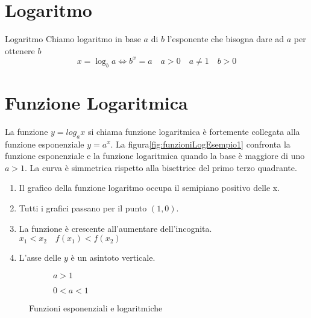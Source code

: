 \section{Logaritmo}
\label{sec:Lograritmo}
\begin{definizionet}{Logaritmo}{}
	Chiamo logaritmo in base $a$ di $b$ l'esponente che bisogna dare ad $a$ per ottenere $b$ \[x=\log_ba\Leftrightarrow b^{x}=a\quad a>0\quad a\neq  1\quad b>0 \]
\end{definizionet} 
\section{Funzione Logaritmica}
\label{FunzioneLogaritmica}
La funzione $y=log_ax$ si chiama funzione logaritmica è fortemente collegata alla funzione esponenziale $y=a^x$. La figura\nobs\vref{fig:funzioniLogEsempio1} confronta la funzione esponenziale e la funzione logaritmica  quando la base è maggiore di uno $a>1$. La curva è simmetrica rispetto alla bisettrice del primo terzo quadrante. 
\begin{enumerate}
	\item Il grafico della funzione logaritmo occupa il semipiano positivo delle x.
	\item Tutti i grafici passano per il punto $(1,0)$.
	\item La funzione è crescente all'aumentare dell'incognita. $x_1<x_2\quad f(x_1)<f(x_2)$ 
	\item L'asse delle $y$ è un asintoto verticale.
\end{enumerate} 
\begin{figure}
	\centering
	\begin{subfigure}[b]{.4\linewidth}
		\centering
		
		\caption{$a>1$}
		\label{fig:funzioniLogEsempio1}
	\end{subfigure}\qquad
	\centering
	\begin{subfigure}[b]{.4\linewidth}
		\centering
		
		\caption{$0<a<1$}
		\label{fig:funzioniLogEsempio2}
	\end{subfigure}%
	\caption{Funzioni esponenziali e logaritmiche}
	\label{fig:funzExp1}
\end{figure}
